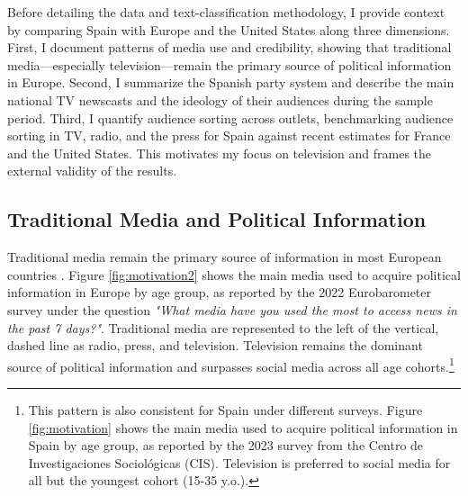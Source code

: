 \documentclass[12pt]{article}
\begin{document}
	Before detailing the data and text-classification methodology, I provide context by comparing Spain with Europe and the United States along three dimensions. First, I document patterns of media use and credibility, showing that traditional media—especially television—remain the primary source of political information in Europe. Second, I summarize the Spanish party system and describe the main national TV newscasts and the ideology of their audiences during the sample period. Third, I quantify audience sorting across outlets, benchmarking audience sorting in TV, radio, and the press for Spain against recent estimates for France and the United States. This motivates my focus on television and frames the external validity of the results.
	
	\label{sec:context}
	
	\subsection{Traditional Media and Political Information}
	
	Traditional media remain the primary source of information in most European countries \citep{europarl2024}. Figure \ref{fig:motivation2} shows the main media used to acquire political information in Europe by age group, as reported by the 2022 Eurobarometer survey under the question \textit{"What media have you used the most to access news in the past 7 days?"}. Traditional media are represented to the left of the vertical, dashed line as radio, press, and television. Television remains the dominant source of political information and  surpasses social media across all age cohorts.\footnote{This pattern is also consistent for Spain under different surveys. Figure \ref{fig:motivation} shows the main media used to acquire political information in Spain by age group, as reported by the 2023 survey from the Centro de Investigaciones Sociológicas (CIS). Television is preferred to social media for all but the youngest cohort (15-35 y.o.). 
	}
	
	
	
\end{document}
